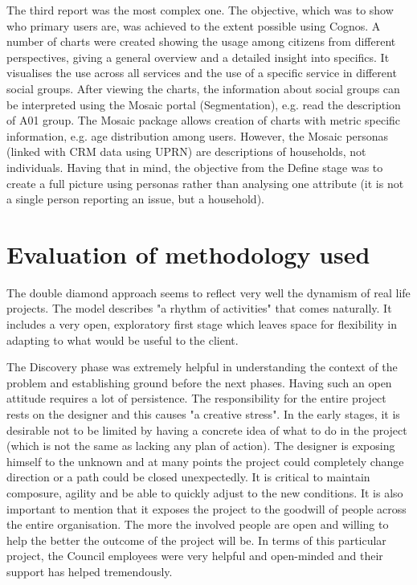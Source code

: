 The third report was the most complex one. The objective, which was to show who primary users are, was achieved to the extent possible using Cognos. A number of charts were created showing the usage among citizens from different perspectives, giving a general overview and a detailed insight into specifics. It visualises the use across all services and the use of a specific service in different social groups. After viewing the charts, the information about social groups can be interpreted using the Mosaic portal (Segmentation), e.g. read the description of A01 group. The Mosaic package allows creation of charts with metric specific information, e.g. age distribution among users. However, the Mosaic personas (linked with CRM data using UPRN) are descriptions of households, not individuals. Having that in mind, the objective from the Define stage was to create a full picture using personas rather than analysing one attribute (it is not a single person reporting an issue, but a household).

	\section{Evaluation of methodology used}

The double diamond approach seems to reflect very well the dynamism of real life projects. The model describes "a rhythm of activities" that comes naturally. It includes a very open, exploratory first stage which leaves space for flexibility in adapting to what would be useful to the client.

The Discovery phase was extremely helpful in understanding the context of the problem and establishing ground before the next phases. Having such an open attitude requires a lot of persistence. The responsibility for the entire project rests on the designer and this causes "a creative stress". In the early stages, it is desirable not to be limited by having a concrete idea of what to do in the project (which is not the same as lacking any plan of action). The designer is exposing himself to the unknown and at many points the project could completely change direction or a path could be closed unexpectedly. It is critical to maintain composure, agility and be able to quickly adjust to the new conditions. It is also important to mention that it exposes the project to the goodwill of people across the entire organisation. The more the involved people are open and willing to help the better the outcome of the project will be. In terms of this particular project, the Council employees were very helpful and open-minded and their support has helped tremendously.

